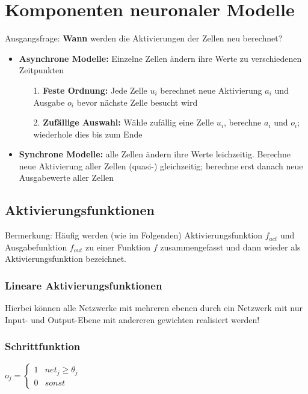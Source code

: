\section*{Komponenten neuronaler Modelle}
Ausgangsfrage: \textbf{Wann} werden die Aktivierungen der Zellen neu berechnet?\\
\begin{itemize}
\item \textbf{Asynchrone Modelle:} Einzelne Zellen ändern ihre Werte zu verschiedenen Zeitpunkten
\begin{itemize}
\item[1.] \textbf{Feste Ordnung:} Jede Zelle $u_i$ berechnet neue Aktivierung $a_i$ und Ausgabe $o_i$ bevor nächste Zelle besucht wird
\item[2.] \textbf{Zufällige Auswahl:} Wähle zufällig eine Zelle $u_i$, berechne $a_i$ und $o_i$; wiederhole dies bis zum Ende
\end{itemize}
\item \textbf{Synchrone Modelle:} alle Zellen ändern ihre Werte leichzeitig. Berechne neue Aktivierung aller Zellen (quasi-) gleichzeitig; berechne erst danach neue Ausgabewerte aller Zellen 
\end{itemize}

\subsection{Aktivierungsfunktionen}
Bermerkung: Häufig werden (wie im Folgenden) Aktivierungsfunktion $f_{act}$ und Ausgabefunktion $f_{out}$ zu einer Funktion $f$ zusammengefasst und dann wieder als Aktivierungsfunktion bezeichnet.\\
\subsubsection*{Lineare Aktivierungsfunktionen}
Hierbei können alle Netzwerke mit mehreren ebenen durch ein Netzwerk mit nur Input- und Output-Ebene mit andereren gewichten realisiert werden!

\subsubsection*{Schrittfunktion}
$o_j = \begin{cases} 1 & net_j \geq \theta_j\\ 0 & sonst \end{cases}$